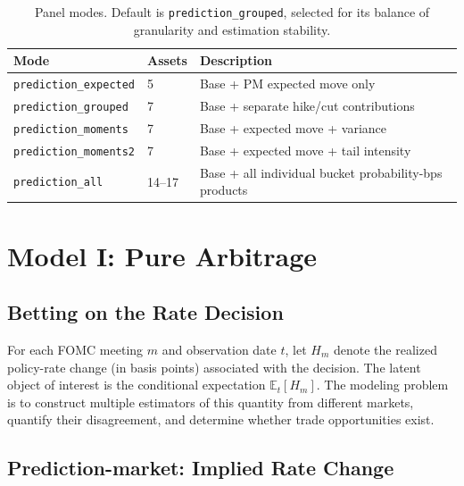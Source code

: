 \begin{table}[h]
\centering
\small
\begin{tabular}{llp{6.5cm}}
\toprule
\textbf{Mode} & \textbf{Assets} & \textbf{Description} \\
\midrule
\texttt{prediction\_expected}  & 5     & Base + PM expected move only \\
\texttt{prediction\_grouped}   & 7     & Base + separate hike/cut contributions \\
\texttt{prediction\_moments}   & 7     & Base + expected move + variance \\
\texttt{prediction\_moments2}  & 7     & Base + expected move + tail intensity \\
\texttt{prediction\_all}       & 14--17 & Base + all individual bucket probability-bps products \\
\bottomrule
\end{tabular}
\caption{Panel modes. Default is \texttt{prediction\_grouped}, selected for its balance of granularity and estimation stability.}
\end{table}



\section{Model I: Pure Arbitrage}

\subsection{Betting on the Rate Decision}

For each FOMC meeting $m$ and observation date $t$, let $H_m$ denote the realized policy-rate change (in basis points) associated with the decision. The latent object of interest is the conditional expectation $\mathbb{E}_t[H_m]$. The modeling problem is to construct multiple estimators of this quantity from different markets, quantify their disagreement, and determine whether trade opportunities exist.

\subsection{Prediction-market: Implied Rate Change}

